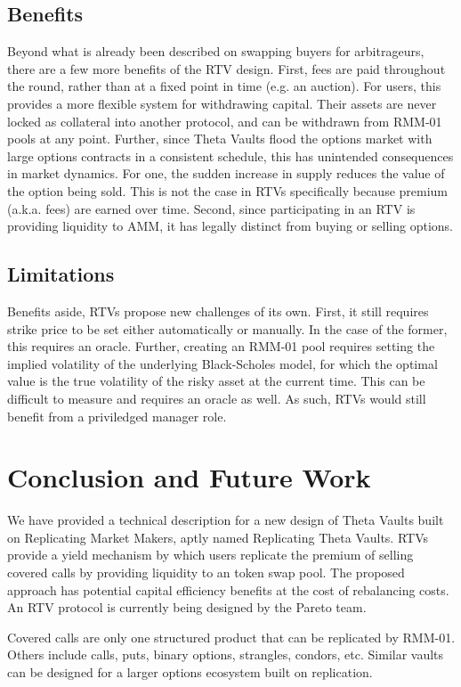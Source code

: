 \documentclass[hidelinks, 12pt]{article}
\begin{document}
\subsection{Benefits}

Beyond what is already been described on swapping buyers for arbitrageurs, there are a few more benefits of the RTV design. First, fees are paid throughout the round, rather than at a fixed point in time (e.g. an auction). For users, this provides a more flexible system for withdrawing capital. Their assets are never locked as collateral into another protocol, and can be withdrawn from RMM-01 pools at any point. Further, since Theta Vaults flood the options market with large options contracts in a consistent schedule, this has unintended consequences in market dynamics. For one, the sudden increase in supply reduces the value of the option being sold. This is not the case in RTVs specifically because premium (a.k.a. fees) are earned over time. Second, since participating in an RTV is providing liquidity to AMM, it has legally distinct from buying or selling options.

\subsection{Limitations}

Benefits aside, RTVs propose new challenges of its own. First, it still requires strike price to be set either automatically or manually. In the case of the former, this requires an oracle. Further, creating an RMM-01 pool requires setting the implied volatility of the underlying Black-Scholes model, for which the optimal value is the true volatility of the risky asset at the current time. This can be difficult to measure and requires an oracle as well. As such, RTVs would still benefit from a priviledged manager role.

\section{Conclusion and Future Work}

We have provided a technical description for a new design of Theta Vaults built on Replicating Market Makers, aptly named Replicating Theta Vaults. RTVs provide a yield mechanism by which users replicate the premium of selling covered calls by providing liquidity to an token swap pool. The proposed approach has potential capital efficiency benefits at the cost of rebalancing costs.
An RTV protocol is currently being designed by the Pareto team.

Covered calls are only one structured product that can be replicated by RMM-01. Others include calls, puts, binary options, strangles, condors, etc. Similar vaults can be designed for a larger options ecosystem built on replication.



\end{document}
